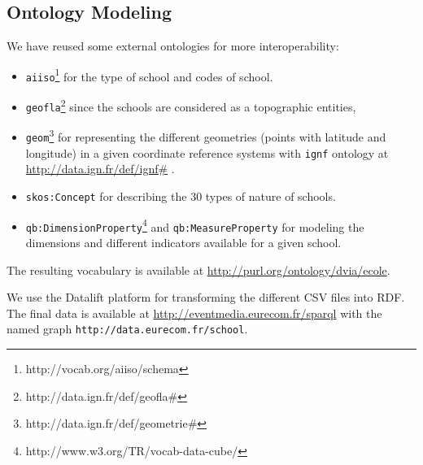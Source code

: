 \subsection{Ontology Modeling}
We have reused some external ontologies for more interoperability:
\begin{itemize}
\item \texttt{aiiso}\footnote{http://vocab.org/aiiso/schema} for the type of school and codes of school.
\item \texttt{geofla}\footnote{http://data.ign.fr/def/geofla\#} since the schools are considered as a topographic entities,
\item \texttt{geom}\footnote{http://data.ign.fr/def/geometrie\#} for representing the different geometries (points with latitude and longitude) in a given coordinate reference systems with \texttt{ignf} ontology at \url{http://data.ign.fr/def/ignf#} . 
\item \texttt{skos:Concept} for describing the 30 types of nature of schools. 
\item \texttt{qb:DimensionProperty}\footnote{http://www.w3.org/TR/vocab-data-cube/} and \texttt{qb:MeasureProperty} for modeling the dimensions and different indicators available for a given school. 
\end{itemize}
The resulting vocabulary is available at \url{http://purl.org/ontology/dvia/ecole}. 

We use the Datalift platform for transforming the different CSV files into RDF. The final data is available  at \url{http://eventmedia.eurecom.fr/sparql} with the named graph \texttt{http://data.eurecom.fr/school}.

